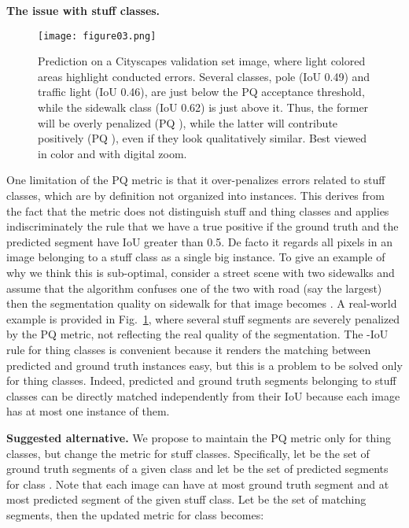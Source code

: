 \documentclass[10pt,twocolumn,letterpaper]{article}
\renewcommand{\paragraph}[1]{
        \vspace{3pt}
	\noindent\textbf{#1}}
\begin{document}
\paragraph{The issue with stuff classes.}
\begin{figure}
    \texttt{[image: figure03.png]}
    \caption{Prediction on a Cityscapes validation set image, where light colored areas highlight conducted errors. Several classes, \eg pole (IoU 0.49) and traffic light (IoU 0.46), are just below the PQ acceptance threshold, while the sidewalk class (IoU 0.62) is just above it. Thus, the former will be overly penalized (PQ ), while the latter will contribute positively (PQ ), even if they look qualitatively similar. Best viewed in color and with digital zoom.}
    \label{fig:pq_example}
    \vspace{-10pt}
\end{figure}
One limitation of the PQ metric is that it over-penalizes errors related to stuff classes, which are by definition not organized into instances.
This derives from the fact that the metric does not distinguish stuff and thing classes and applies indiscriminately the rule that we have a true positive if the ground truth and the predicted segment have IoU greater than 0.5. De facto it regards all pixels in an image belonging to a stuff class as a single big instance.
To give an example of why we think this is sub-optimal, consider a street scene with two sidewalks and assume that the algorithm confuses one of the two with road (say the largest) then the segmentation quality on sidewalk for that image becomes . A real-world example is provided in Fig.~\ref{fig:pq_example}, where several stuff segments are severely penalized by the PQ metric, not reflecting the real quality of the segmentation.
The -IoU rule for thing classes is convenient because it renders the matching between predicted and ground truth instances easy, but this is a problem to be solved only for thing classes. Indeed, predicted and ground truth segments belonging to stuff classes can be directly matched independently from their IoU because each image has at most one instance of them. 


\paragraph{Suggested alternative.}
We propose to maintain the PQ metric only for thing classes, but change the metric for stuff classes.
Specifically, let  be the set of ground truth segments of a given class  and let  be the set of predicted segments for class .
Note that each image can have at most  ground truth segment and at most  predicted segment of the given stuff class.
Let  be the set of matching segments, then the updated metric for class  becomes:
\end{document}
